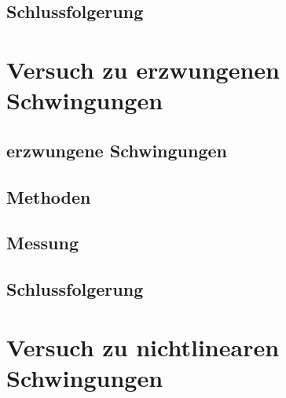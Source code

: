 \documentclass[11pt,a4paper,titlepage, ngerman]{article}
\begin{document}
				
			\subsection*{Schlussfolgerung}
			
				
		\section{Versuch zu erzwungenen Schwingungen}
		
			
			\subsection*{erzwungene Schwingungen}
			
			
			\subsection*{Methoden}
				
			
			\subsection*{Messung}
			
				
			\subsection*{Schlussfolgerung}
			
				
		\section{Versuch zu nichtlinearen Schwingungen}
		
\end{document}
